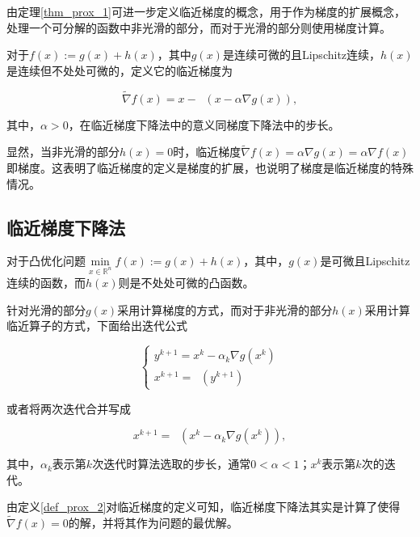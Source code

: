 由定理\ref{thm_prox_1}可进一步定义临近梯度的概念，用于作为梯度的扩展概念，处理一个可分解的函数中非光滑的部分，而对于光滑的部分则使用梯度计算。

\begin{definition}\label{def_prox_2}
    对于$f(x) := g(x)+h(x)$，其中$g(x)$是连续可微的且Lipschitz连续，$h(x)$是连续但不处处可微的，定义它的临近梯度为

    \begin{equation}
        \tilde{\nabla} f(x) = x - \mathop{\mathrm{prox_{\alpha h}}}(x-\alpha \nabla g(x)),
    \end{equation}

    其中，$\alpha > 0$，在临近梯度下降法中的意义同梯度下降法中的步长。
\end{definition}

显然，当非光滑的部分$h(x)=0$时，临近梯度$\tilde{\nabla} f(x)=\alpha \nabla g(x)=\alpha \nabla f(x)$即梯度。这表明了临近梯度的定义是梯度的扩展，也说明了梯度是临近梯度的特殊情况。

\subsection{临近梯度下降法}

对于凸优化问题$\min\limits_{x\in \mathbb{R}^{n}} f(x) := g(x) + h(x)$，其中，$g(x)$是可微且Lipschitz连续的函数，而$h(x)$则是不处处可微的凸函数。

针对光滑的部分$g(x)$采用计算梯度的方式，而对于非光滑的部分$h(x)$采用计算临近算子的方式，下面给出迭代公式

\begin{equation}
    \begin{cases}
        y^{k+1} = x^{k} - \alpha_{k}\nabla g(x^{k}) \\
        x^{k+1} = \mathop{\mathrm{prox_{\alpha_{k} h}}}(y^{k+1})
    \end{cases}
\end{equation}

或者将两次迭代合并写成

\begin{equation}\label{eq_prox_2}
    x^{k+1} = \mathop{\mathrm{prox_{\alpha_{k} h}}}(x^{k} - \alpha_{k}\nabla g(x^{k})),
\end{equation}

其中，$\alpha_{k}$表示第$k$次迭代时算法选取的步长，通常$0<\alpha<1$；$x^{k}$表示第$k$次的迭代。

由定义\ref{def_prox_2}对临近梯度的定义可知，临近梯度下降法其实是计算了使得$\tilde{\nabla} f(x)=0$的解，并将其作为问题的最优解。

